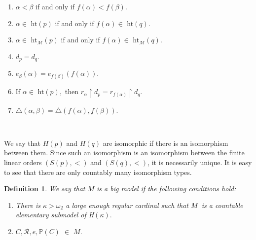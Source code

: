 \documentclass{article}
\newtheorem{definition}[theorem]{Definition}
\begin{document}
\begin{enumerate}
\item $\alpha<\beta$ if and only if $f\left(  \alpha\right)  <f\left(
\beta\right)  .$

\item $\alpha\in$ \textsf{ht}$\left(  p\right)  $ if and only if $f\left(
\alpha\right)  \in$ \textsf{ht}$\left(  q\right)  .$

\item $\alpha\in$ \textsf{ht}$_{\mathcal{M}}\left(  p\right)  $ if and only if
$f\left(  \alpha\right)  \in$ \textsf{ht}$_{\mathcal{M}}\left(  q\right)  .$

\item $d_{p}=d_{q}.$

\item $e_{\beta}\left(  \alpha\right)  =e_{f\left(  \beta\right)  }\left(
f\left(  \alpha\right)  \right)  .$

\item If $\alpha\in$ \textsf{ht}$\left(  p\right)  ,$ then $r_{\alpha
}\upharpoonright d_{p}=r_{f\left(  \alpha\right)  }\upharpoonright d_{q}.$

\item $\triangle\left(  \alpha,\beta\right)  =\triangle\left(  f\left(
\alpha\right)  ,f\left(  \beta\right)  \right)  .$
\end{enumerate}

\qquad\qquad\qquad\qquad\qquad\ \ \ \ 

We say that $H\left(  p\right)  $ and $H\left(  q\right)  $ are isomorphic if
there is an isomorphism between them. Since such an isomorphism is an
isomorphism between the finite linear orders $\left(  S\left(  p\right)
,<\right)  $ and $\left(  S\left(  q\right)  ,<\right)  $, it is necessarily
unique. It is easy to see that there are only countably many isomorphism types.

\begin{definition}
We say that $M$ is a \emph{big model} if the following conditions hold:

\begin{enumerate}
\item There is $\kappa>\omega_{2}$ a large enough regular cardinal such that
$M$ $\ $is a countable elementary submodel of \textsf{H}$\left(
\kappa\right)  .$

\item $C,\mathcal{R},e,\mathbb{P}\left(  C\right)  $ $\mathbb{\in}$ $M.$
\end{enumerate}
\end{definition}
\end{document}
